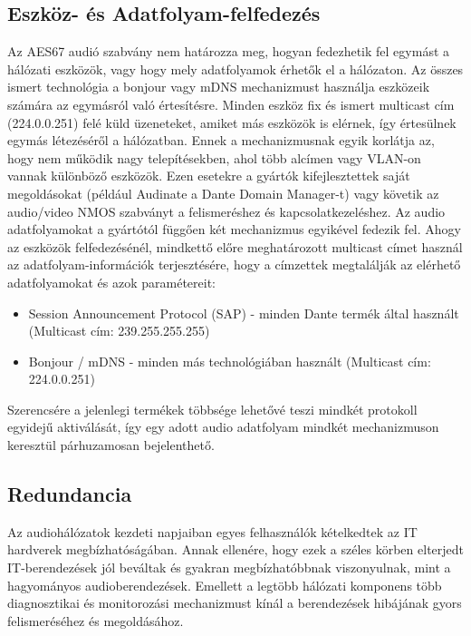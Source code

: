 \subsection{Eszköz- és Adatfolyam-felfedezés}
Az AES67 audió szabvány nem határozza meg, hogyan fedezhetik fel egymást a
hálózati eszközök, vagy hogy mely adatfolyamok érhetők el a hálózaton.
Az összes ismert technológia a bonjour vagy mDNS mechanizmust használja eszközeik számára
az egymásról való értesítésre. 
Minden eszköz fix és ismert multicast cím (224.0.0.251) felé küld
üzeneteket, amiket más eszközök is elérnek, így értesülnek egymás létezéséről a hálózatban.
Ennek a mechanizmusnak egyik korlátja az, hogy nem működik nagy telepítésekben,
ahol több alcímen vagy VLAN-on vannak különböző eszközök. Ezen esetekre a gyártók kifejlesztettek
saját megoldásokat (például Audinate a Dante Domain Manager-t) vagy
követik az audio/video NMOS szabványt a felismeréshez és kapcsolatkezeléshez.
Az audio adatfolyamokat a gyártótól függően két mechanizmus egyikével fedezik fel. Ahogy
az eszközök felfedezésénél, mindkettő előre meghatározott multicast címet
használ az adatfolyam-információk terjesztésére, hogy a címzettek megtalálják az
elérhető adatfolyamokat és azok paramétereit:
\begin{itemize}
	\item Session Announcement Protocol (SAP) - minden Dante termék által használt (Multicast cím: 239.255.255.255)
\end{itemize}

\begin{itemize}
	\item Bonjour / mDNS - minden más technológiában használt (Multicast cím: 224.0.0.251) 
\end{itemize}
Szerencsére a jelenlegi termékek többsége
lehetővé teszi mindkét protokoll egyidejű aktiválását, így egy adott audio
adatfolyam mindkét mechanizmuson keresztül párhuzamosan bejelenthető.
\subsection{Redundancia}
Az audiohálózatok kezdeti napjaiban egyes felhasználók kételkedtek az IT
hardverek megbízhatóságában. Annak ellenére, hogy ezek a széles körben elterjedt
IT-berendezések jól beváltak és gyakran megbízhatóbbnak viszonyulnak, mint a hagyományos
audioberendezések. Emellett a legtöbb hálózati komponens több diagnosztikai és monitorozási
mechanizmust kínál a berendezések hibájának gyors felismeréséhez és megoldásához.
